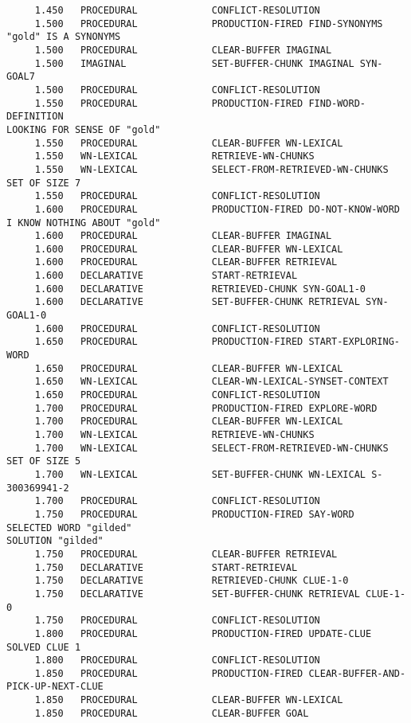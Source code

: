 \begin{verbatim}
     1.450   PROCEDURAL             CONFLICT-RESOLUTION 
     1.500   PROCEDURAL             PRODUCTION-FIRED FIND-SYNONYMS 
"gold" IS A SYNONYMS 
     1.500   PROCEDURAL             CLEAR-BUFFER IMAGINAL 
     1.500   IMAGINAL               SET-BUFFER-CHUNK IMAGINAL SYN-GOAL7 
     1.500   PROCEDURAL             CONFLICT-RESOLUTION 
     1.550   PROCEDURAL             PRODUCTION-FIRED FIND-WORD-DEFINITION 
LOOKING FOR SENSE OF "gold" 
     1.550   PROCEDURAL             CLEAR-BUFFER WN-LEXICAL 
     1.550   WN-LEXICAL             RETRIEVE-WN-CHUNKS 
     1.550   WN-LEXICAL             SELECT-FROM-RETRIEVED-WN-CHUNKS SET OF SIZE 7 
     1.550   PROCEDURAL             CONFLICT-RESOLUTION 
     1.600   PROCEDURAL             PRODUCTION-FIRED DO-NOT-KNOW-WORD 
I KNOW NOTHING ABOUT "gold" 
     1.600   PROCEDURAL             CLEAR-BUFFER IMAGINAL 
     1.600   PROCEDURAL             CLEAR-BUFFER WN-LEXICAL 
     1.600   PROCEDURAL             CLEAR-BUFFER RETRIEVAL 
     1.600   DECLARATIVE            START-RETRIEVAL 
     1.600   DECLARATIVE            RETRIEVED-CHUNK SYN-GOAL1-0 
     1.600   DECLARATIVE            SET-BUFFER-CHUNK RETRIEVAL SYN-GOAL1-0 
     1.600   PROCEDURAL             CONFLICT-RESOLUTION 
     1.650   PROCEDURAL             PRODUCTION-FIRED START-EXPLORING-WORD 
     1.650   PROCEDURAL             CLEAR-BUFFER WN-LEXICAL 
     1.650   WN-LEXICAL             CLEAR-WN-LEXICAL-SYNSET-CONTEXT 
     1.650   PROCEDURAL             CONFLICT-RESOLUTION 
     1.700   PROCEDURAL             PRODUCTION-FIRED EXPLORE-WORD 
     1.700   PROCEDURAL             CLEAR-BUFFER WN-LEXICAL 
     1.700   WN-LEXICAL             RETRIEVE-WN-CHUNKS 
     1.700   WN-LEXICAL             SELECT-FROM-RETRIEVED-WN-CHUNKS SET OF SIZE 5 
     1.700   WN-LEXICAL             SET-BUFFER-CHUNK WN-LEXICAL S-300369941-2 
     1.700   PROCEDURAL             CONFLICT-RESOLUTION 
     1.750   PROCEDURAL             PRODUCTION-FIRED SAY-WORD 
SELECTED WORD "gilded" 
SOLUTION "gilded" 
     1.750   PROCEDURAL             CLEAR-BUFFER RETRIEVAL 
     1.750   DECLARATIVE            START-RETRIEVAL 
     1.750   DECLARATIVE            RETRIEVED-CHUNK CLUE-1-0 
     1.750   DECLARATIVE            SET-BUFFER-CHUNK RETRIEVAL CLUE-1-0 
     1.750   PROCEDURAL             CONFLICT-RESOLUTION 
     1.800   PROCEDURAL             PRODUCTION-FIRED UPDATE-CLUE 
SOLVED CLUE 1 
     1.800   PROCEDURAL             CONFLICT-RESOLUTION 
     1.850   PROCEDURAL             PRODUCTION-FIRED CLEAR-BUFFER-AND-PICK-UP-NEXT-CLUE 
     1.850   PROCEDURAL             CLEAR-BUFFER WN-LEXICAL 
     1.850   PROCEDURAL             CLEAR-BUFFER GOAL 

\end{verbatim}
